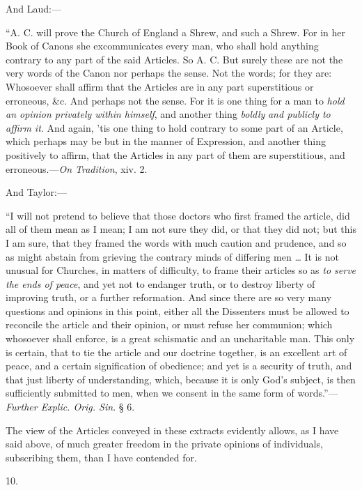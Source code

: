 And Laud:—

``A.
C. will prove the Church of England a Shrew, and such a Shrew. For in
her Book of Canons she excommunicates every man, who shall hold
anything contrary to any part of the said Articles. So A. C. But
surely these are not the very words of the Canon nor perhaps the
sense. Not the words; for they are: Whosoever shall affirm that the
Articles are in any part superstitious or erroneous, \&c. And
perhaps not the sense. For it is one thing for a man to \emph{hold an
opinion privately within himself}, and another thing \emph{boldly}
\emph{and publicly to affirm it}.
And again, 'tis one thing to hold contrary to some part of an Article,
which perhaps may be but in the manner of Expression, and another
thing positively to affirm, that the Articles in any part of them are
superstitious, and erroneous.—\emph{On Tradition}, xiv. 2.

And Taylor:—

``I
will not pretend to believe that those doctors who first framed the
article, did all of them mean as I mean; I am not sure they did, or
that they did not; but this I am sure, that they framed the words with
much caution and prudence, and so as might abstain from grieving the
contrary minds of differing men … It is not unusual for Churches, in
matters of difficulty, to frame their articles so as \emph{to serve the
ends of peace}, and yet not to endanger truth, or to destroy
liberty of improving truth, or a further reformation. And since there
are so very many questions and opinions in this point, either all the
Dissenters must be allowed to reconcile the article and their opinion,
or must refuse her communion; which whosoever shall enforce, is a
great schismatic and an uncharitable man. This only is certain, that
to tie the article and our doctrine together, is an excellent art of
peace, and a certain signification of obedience; and yet is a security
of truth, and that just liberty of understanding, which, because it is
only God's subject, is then sufficiently submitted to men, when we
consent in the same form of words.''—\emph{Further Explic. Orig. Sin}.
§ 6.

The view of the Articles conveyed in these
extracts evidently allows, as I have said above, of much greater
freedom in the private opinions of individuals, subscribing them, than
I have contended for.

10.

